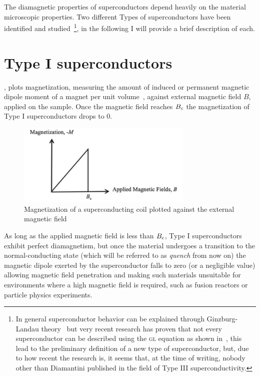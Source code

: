 The diamagnetic properties of superconductors depend heavily on the material microscopic properties. Two different Types of superconductors have been
identified and studied~\footnote{In general superconductor behavior can be explained through
	Ginzburg-Landau theory~\cite{Cyrot1973} but very recent research has proven that not every
	superconductor can be described using the \textsc{gl} equation as shown
	in~\cite{diamantini2023typeiiisuperconductivity}, this lead to the preliminary definition of
	a new type of superconductor, but, due to how recent the research is, it seems that, at the
	time of writing, nobody other than Diamantini published in the field of Type III superconductivity.
}, in the following I will provide a brief description of each.

\section{Type I superconductors}
\label{sec:type1}
, plots magnetization, measuring the amount of induced or
permanent magnetic dipole moment of a magnet per unit volume~\cite{polarization-magnetization},
against external magnetic field $B$, applied on the sample. Once the magnetic field reaches $B_c$ the
magnetization of Type I superconductors drops to $0$.
\begin{figure}
	\centering
	\includegraphics[width=0.75\textwidth]{./img/type1.png}
	\caption{Magnetization of a superconducting coil plotted against the external magnetic
		field~\cite{slimani2022superconducting}}
	\label{img:type1-transition}
\end{figure}
As long as the applied magnetic field is less than $B_c$, Type I superconductors exhibit perfect
diamagnetism, but once the material undergoes a transition to the normal-conducting
state (which will be referred to as \emph{quench} from now on) the magnetic dipole exerted by the
superconductor falls to zero (or a negligible value) allowing magnetic field penetration and making
such materials unsuitable for environments where a high magnetic field is required, such as fusion
reactors or particle physics experiments.

